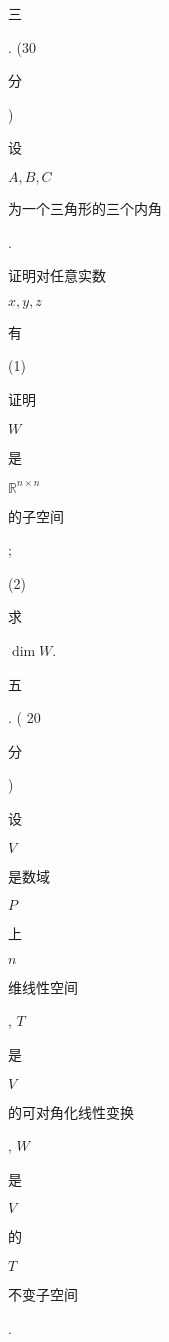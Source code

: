 \documentclass[10pt]{article}
\begin{document}
\begin{CJK}{UTF8}{mj}三\end{CJK}. (30 \begin{CJK}{UTF8}{mj}分\end{CJK}) \begin{CJK}{UTF8}{mj}设\end{CJK} $A, B, C$ \begin{CJK}{UTF8}{mj}为一个三角形的三个内角\end{CJK}. \begin{CJK}{UTF8}{mj}证明对任意实数\end{CJK} $x, y, z$ \begin{CJK}{UTF8}{mj}有\end{CJK}

(1) \begin{CJK}{UTF8}{mj}证明\end{CJK} $W$ \begin{CJK}{UTF8}{mj}是\end{CJK} $\mathbb{R}^{n \times n}$ \begin{CJK}{UTF8}{mj}的子空间\end{CJK};

(2) \begin{CJK}{UTF8}{mj}求\end{CJK} $\operatorname{dim} W$.

\begin{CJK}{UTF8}{mj}五\end{CJK}. ( 20 \begin{CJK}{UTF8}{mj}分\end{CJK}) \begin{CJK}{UTF8}{mj}设\end{CJK} $V$ \begin{CJK}{UTF8}{mj}是数域\end{CJK} $P$ \begin{CJK}{UTF8}{mj}上\end{CJK} $n$ \begin{CJK}{UTF8}{mj}维线性空间\end{CJK}, $T$ \begin{CJK}{UTF8}{mj}是\end{CJK} $V$ \begin{CJK}{UTF8}{mj}的可对角化线性变换\end{CJK}, $W$ \begin{CJK}{UTF8}{mj}是\end{CJK} $V$ \begin{CJK}{UTF8}{mj}的\end{CJK} $T$ \begin{CJK}{UTF8}{mj}不变子空间\end{CJK}.
\end{document}
